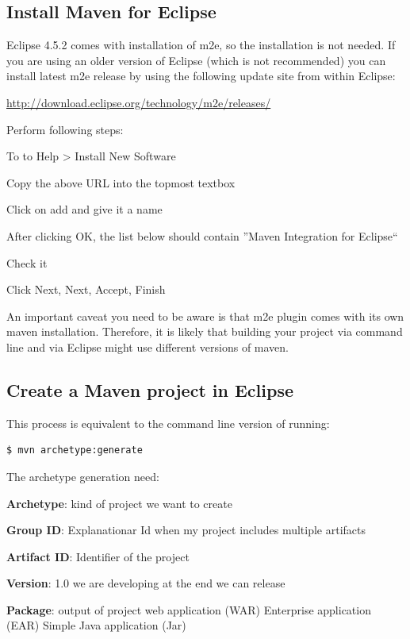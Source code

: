 \documentclass{article}
\begin{document}
\subsection{Install Maven for Eclipse}
Eclipse 4.5.2 comes with installation of m2e, so the installation is
not needed. If you are using an older version of Eclipse (which is not
recommended) you can install latest m2e release by using the following
update site from within Eclipse: 

\url{http://download.eclipse.org/technology/m2e/releases/}

Perform following steps:
\begin{compactitem}
\item To to Help > Install New Software
\item Copy the above URL into the topmost textbox
\item Click on add and give it a name
\item After clicking OK, the list below should contain ''Maven Integration for Eclipse``
\item Check it
\item Click Next, Next, Accept, Finish
\end{compactitem}

An important caveat you need to be aware is that m2e plugin comes with
its own maven installation. Therefore, it is likely that building your
project via command line and via Eclipse might use different versions
of maven.

\subsection{Create a Maven project in Eclipse}

This process is equivalent to the command line version of running:
\begin{lstlisting}
$ mvn archetype:generate 
\end{lstlisting}


The archetype generation need:
\begin{compactitem}
\item \textbf{Archetype}: kind of project we want to create
\item \textbf{Group ID}: Explanationar Id when my project includes multiple artifacts
\item \textbf{Artifact ID}: Identifier of the project
\item \textbf{Version}: 1.0 we are developing at the end we can release
\item \textbf{Package}: output of project web application (WAR) Enterprise application (EAR) Simple Java application (Jar)
\end{compactitem}
\end{document}
